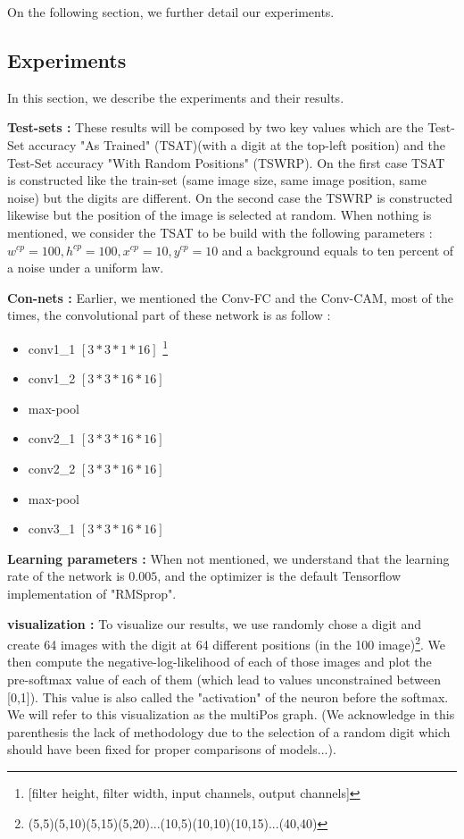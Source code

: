 			On the following section, we further detail our experiments.

		\subsection{Experiments}
		\label{sub:experiments}
			In this section, we describe the experiments and their results. 

			\textbf{Test-sets :} These results will be composed by two key values which are the Test-Set accuracy "As Trained" (TSAT)(with a digit at the top-left position) and the Test-Set accuracy "With Random Positions" (TSWRP). On the first case TSAT is constructed like the train-set (same image size, same image position, same noise) but the digits are different. On the second case the TSWRP is constructed likewise but the position of the image is selected at random. 
			When nothing is mentioned, we consider the TSAT to be build with the following parameters : $w^{cp}=100,h^{cp}=100, x^{cp}=10,y^{cp}=10$ and a background equals to ten percent of a noise under a uniform law.

			\textbf{Con-nets :}
			Earlier, we mentioned the Conv-FC and the Conv-CAM, most of the times, the convolutional part of these network is as follow :
			\begin{itemize}
				\setlength\itemsep{-0.5em}
				\item conv1\_1 $[3*3*1*16]$ \footnote{[filter height, filter width, input channels, output channels]}
				\item conv1\_2 $[3*3*16*16]$
				\item max-pool
				\item conv2\_1 $[3*3*16*16]$
				\item conv2\_2 $[3*3*16*16]$
				\item max-pool
				\item conv3\_1 $[3*3*16*16]$
			\end{itemize}
			\textbf{Learning parameters :} When not mentioned, we understand that the learning rate of the network is $0.005$, and the optimizer is the default Tensorflow implementation of "RMSprop".

			\textbf{visualization :} To visualize our results, we use randomly chose a digit and create 64 images with the digit at 64 different positions (in the 100 image)\footnote{(5,5)(5,10)(5,15)(5,20)...(10,5)(10,10)(10,15)...(40,40)}. We then compute the negative-log-likelihood of each of those images and plot the pre-softmax value of each of them (which lead to values unconstrained between [0,1]). This value is also called the "activation" of the neuron before the softmax. We will refer to this visualization as the multiPos graph. (We acknowledge in this parenthesis the lack of methodology due to the selection of a random digit which should have been fixed for proper comparisons of models...).

